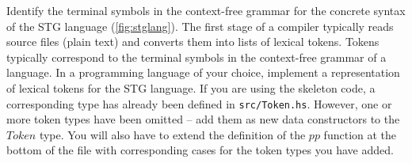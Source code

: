 \documentclass[10pt,a4paper]{exam} %
\begin{document}
\begin{questions}


\question Identify the terminal symbols in the context-free grammar for the concrete syntax of the STG language (\autoref{fig:stglang}). The first stage of a compiler typically reads source files (plain text) and converts them into lists of lexical tokens. Tokens typically correspond to the terminal symbols in the context-free grammar of a language. In a programming language of your choice, implement a representation of lexical tokens for the STG language. If you are using the skeleton code, a corresponding type has already been defined in \texttt{src/Token.hs}. However, one or more token types have been omitted -- add them as new data constructors to the $\mathit{Token}$ type. You will also have to extend the definition of the $\mathit{pp}$ function at the bottom of the file with corresponding cases for the token types you have added.


\end{questions}
\end{document}
